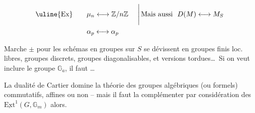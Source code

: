 \[
\begin{aligned}
\text{\uline{Ex}}\qquad &\mu_n\longleftrightarrow\mathbb Z/n\mathbb Z
&\ \Bigg|\, &\text{Mais aussi }\ D(M)\longleftrightarrow M_S\\
&\alpha_p\longleftrightarrow\alpha_p && 
\end{aligned}
\]

Marche $\pm$ pour les schémas en groupes   sur $S$  se dévissent en groupes finis loc. libres, groupes discrets, groupes diagonalisables, et versions  tordues\ldots\ Si on veut inclure le groupe $\mathbb{G}_a$, il faut \ldots

La dualité de Cartier domine la théorie des groupes algébriques (ou formels) commutatifs, affines ou non -- mais il faut la complémenter par considération des $\underline{\mathrm{Ext}}^1(G,\mathbb{G}_m)$ alors.
\clearpage

